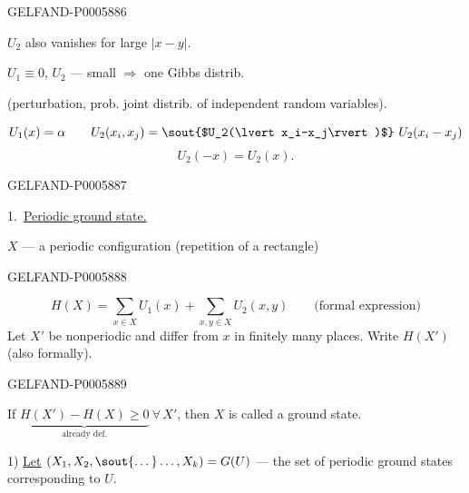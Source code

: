 \begin{GelfandAdjacentEvidence}{GELFAND-P000588}{6}

\(U_2\) also vanishes for large \(\lvert x-y\rvert\).

\(U_1\equiv0\), \(U_2\) — small \(\Rightarrow\) one Gibbs distrib.

(perturbation, prob. joint distrib. of independent random variables).

\[
U_1(x)=\alpha\qquad
U_2(x_i,x_j)=\text{\sout{$U_2(\lvert x_i-x_j\rvert)$}}\ U_2(x_i-x_j)
\]
\[
U_2(-x)=U_2(x).
\]
\end{GelfandAdjacentEvidence}
\begin{GelfandAdjacentEvidence}{GELFAND-P000588}{7}


1.\ \underline{Periodic ground state.}

\(X\) — a periodic configuration (repetition of a rectangle)
\end{GelfandAdjacentEvidence}
\begin{GelfandAdjacentEvidence}{GELFAND-P000588}{8}

\[
H(X)=\sum_{x\in X}U_1(x)+\sum_{x,y\in X}U_2(x,y)
\qquad\text{(formal expression)}
\]
Let \(X'\) be nonperiodic and differ from \(x\) in finitely many places. Write \(H(X')\) (also formally).
\end{GelfandAdjacentEvidence}
\begin{GelfandAdjacentEvidence}{GELFAND-P000588}{9}


If \(\underbrace{H(X')-H(X)\ge0}_{\text{already def.}}\ \forall\,X'\), then \(X\)
is called a ground state.

1) \underline{Let}
\((X_1,X_2,\text{\sout{\textellipsis{}}}\ldots,X_k)=G(U)\)
— the set of periodic ground states corresponding to \(U\).
\end{GelfandAdjacentEvidence}




